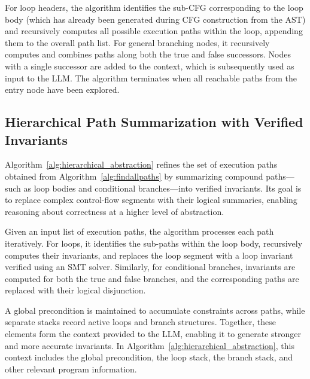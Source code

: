 \documentclass[letterpaper]{article} %
\begin{document}
For loop headers, the algorithm identifies the sub-CFG corresponding to the loop body (which has already been generated during CFG construction from the AST) and recursively computes all possible execution paths within the loop, appending them to the overall path list. For general branching nodes, it recursively computes and combines paths along both the true and false successors. Nodes with a single successor are added to the context, which is subsequently used as input to the LLM. The algorithm terminates when all reachable paths from the entry node have been explored.


\subsection{Hierarchical Path Summarization with Verified Invariants}

Algorithm~\ref{alg:hierarchical_abstraction} refines the set of execution paths obtained from Algorithm~\ref{alg:findallpaths} by summarizing compound paths—such as loop bodies and conditional branches—into verified invariants. Its goal is to replace complex control-flow segments with their logical summaries, enabling reasoning about correctness at a higher level of abstraction.

Given an input list of execution paths, the algorithm processes each path iteratively. For loops, it identifies the sub-paths within the loop body, recursively computes their invariants, and replaces the loop segment with a loop invariant verified using an SMT solver. Similarly, for conditional branches, invariants are computed for both the true and false branches, and the corresponding paths are replaced with their logical disjunction.

A global precondition is maintained to accumulate constraints across paths, while separate stacks record active loops and branch structures. Together, these elements form the context provided to the LLM, enabling it to generate stronger and more accurate invariants. In Algorithm~\ref{alg:hierarchical_abstraction}, this context includes the global precondition, the loop stack, the branch stack, and other relevant program information.
\end{document}
